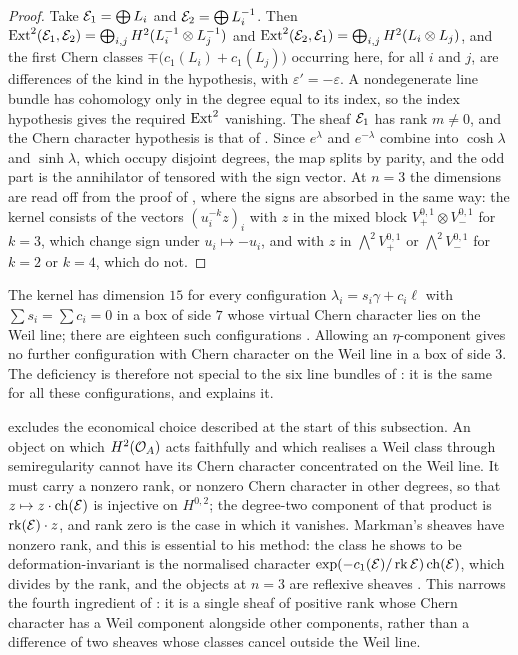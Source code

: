 \begin{proof}
Take $\mathcal{E}_{1}=\bigoplus L_{i}$ and $\mathcal{E}_{2}=\bigoplus L_{i}^{-1}$. Then
$\operatorname{Ext}^{2}(\mathcal{E}_{1},\mathcal{E}_{2})=\bigoplus_{i,j}H^{2}(L_{i}^{-1}\otimes L_{j}^{-1})$
and $\operatorname{Ext}^{2}(\mathcal{E}_{2},\mathcal{E}_{1})=\bigoplus_{i,j}H^{2}(L_{i}\otimes L_{j})$, and
the first Chern classes $\mp\bigl(c_{1}(L_{i})+c_{1}(L_{j})\bigr)$ occurring
here, for all $i$ and $j$, are differences of the kind in the hypothesis,
with $\varepsilon'=-\varepsilon$. A nondegenerate line bundle has cohomology only in
the degree equal to its index, so the index hypothesis gives the required
$\operatorname{Ext}^{2}$ vanishing. The sheaf $\mathcal{E}_{1}$ has rank $m\ne0$, and the Chern
character hypothesis is that of .
Since $e^{\lambda}$ and $e^{-\lambda}$ combine into $\cosh\lambda$ and
$\sinh\lambda$, which occupy disjoint degrees, the map splits by parity, and
the odd part is the annihilator of  tensored with the
sign vector. At $n=3$ the dimensions are read off from the proof of
, where the signs are absorbed in the same way:
the kernel consists of the vectors $(u_{i}^{-k}z)_{i}$ with $z$ in the mixed
block $V_{+}^{0,1}\otimes V_{-}^{0,1}$ for $k=3$, which change sign under
$u_{i}\mapsto-u_{i}$, and with $z$ in $\bigwedge^{2}V_{+}^{0,1}$ or
$\bigwedge^{2}V_{-}^{0,1}$ for $k=2$ or $k=4$, which do not.
\end{proof}

\begin{remark}
\label{rem:familyuniform}
The kernel has dimension $15$ for every configuration
$\lambda_{i}=s_{i}\gamma+c_{i}\ell$ with $\sum s_{i}=\sum c_{i}=0$ in a box
of side $7$ whose virtual Chern character lies on the Weil line; there are
eighteen such configurations \cite{BMB26}. Allowing
an $\eta$-component gives no further configuration with Chern character on
the Weil line in a box of side $3$. The deficiency is therefore not special to
the six line bundles of : it is the same for all
these configurations, and  explains it.

 excludes the economical choice described at the start of
this subsection. An object on which $H^{2}(\mathcal{O}_{A})$ acts faithfully and which
realises a Weil class through semiregularity cannot have its Chern character
concentrated on the Weil line. It must carry a nonzero rank, or nonzero Chern
character in other degrees, so that $z\mapsto z\cdot\operatorname{ch}(\mathcal{E})$ is injective on
$H^{0,2}$; the degree-two component of that product is $\operatorname{rk}(\mathcal{E})\cdot z$, and
rank zero is the case in which it vanishes. Markman's sheaves have nonzero
rank, and this is essential to his method: the class he shows to be
deformation-invariant is the normalised character
$\exp(-c_{1}(\mathcal{E})/\operatorname{rk}\mathcal{E})\operatorname{ch}(\mathcal{E})$, which divides by the rank, and the objects
at $n=3$ are reflexive sheaves \cite{Mar25a,Mar25b}. This narrows the fourth
ingredient of : it is a single sheaf of positive rank
whose Chern character has a Weil component alongside other components, rather
than a difference of two sheaves whose classes cancel outside the Weil line.
\end{remark}

